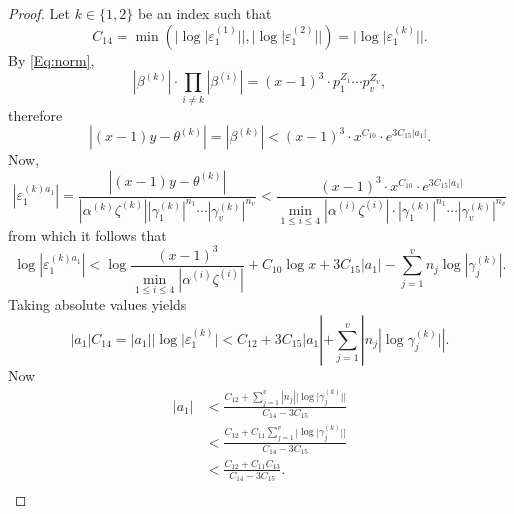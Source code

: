 \begin{proof}
Let $k \in \{1,2\}$ be an index such that 
\[C_{14} = \min \left( |\log|\varepsilon_1^{(1)}||, |\log|\varepsilon_1^{(2)}||\right) = |\log|\varepsilon_1^{(k)}||. \]
By \eqref{Eq:norm}, 
\[|\beta^{(k)}| \cdot \prod_{i \neq k}|\beta^{(i)}| = (x-1)^3\cdot p_1^{Z_1}\cdots p_v^{Z_v}, \]
therefore
\[|(x-1)y-\theta^{(k)}| = |\beta^{(k)}| < (x-1)^3\cdot x^{C_{10}} \cdot e^{3C_{15}|a_1|}.\]
Now, 
\[|\varepsilon_1^{(k)a_1}|
= \frac{|(x-1)y-\theta^{(k)}|}{|\alpha^{(k)}\zeta^{(k)}||\gamma_1^{(k)}|^{n_1}\cdots |\gamma_v^{(k)}|^{n_v}}
< \frac{(x-1)^3\cdot x^{C_{10}} \cdot e^{3C_{15}|a_1|}}{\displaystyle \min_{1\leq i \leq 4}|\alpha^{(i)}\zeta^{(i)}| 		\cdot |\gamma_1^{(k)}|^{n_1}\cdots |\gamma_v^{(k)}|^{n_v}}\]
from which it follows that
\[\log|\varepsilon_1^{(k)a_1}| 
< \log{\frac{(x-1)^3}{\displaystyle \min_{1\leq i \leq 4}|\alpha^{(i)}\zeta^{(i)}|}} +  C_{10}\log{x} + 3C_{15}|a_1|- \sum_{j = 1}^v n_j \log|\gamma_j^{(k)}|.\]
Taking absolute values yields
\[|a_1|C_{14} = |a_1| |\log|\varepsilon_1^{(k)}| < C_{12} + 3C_{15}|a_1| + \sum_{j = 1}^v |n_j|\log{\gamma_j^{(k)}|}|.\]
Now
\[\begin{split}
|a_1| 
& < \frac{C_{12} +\displaystyle\sum_{j = 1}^v |n_j||\log|\gamma_j^{(k)}||}{C_{14} - 3C_{15}}\\
& < \frac{C_{12} +C_{11}\displaystyle\sum_{j = 1}^v |\log|\gamma_j^{(k)}||}{C_{14} - 3C_{15}}\\
& < \frac{C_{12} +C_{11}C_{13}}{C_{14} - 3C_{15}}.\\
\end{split}\]


\end{proof}
